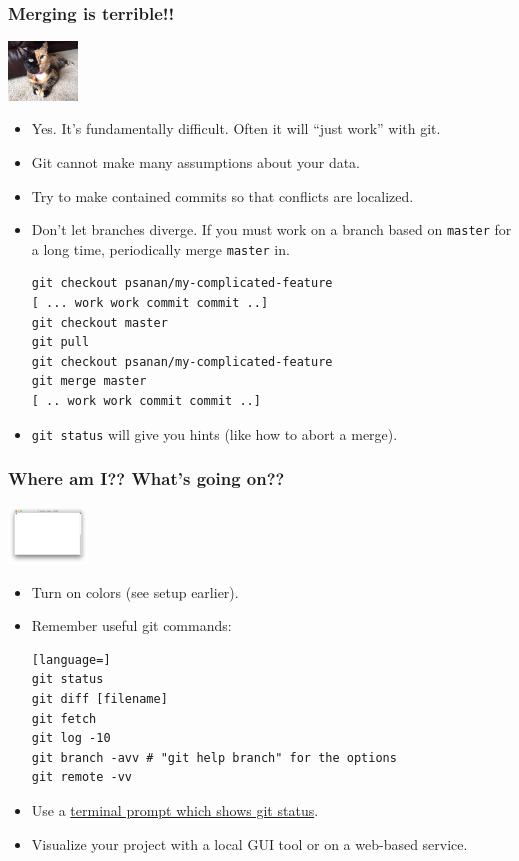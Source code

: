 \begin{frame}[fragile]
\frametitle{Merging is terrible!!}
\begin{center}
\includegraphics[width=70px]{chimera.jpg}
\end{center}
\begin{itemize}
\item Yes. It's fundamentally difficult. Often it will ``just work'' with git.
\item Git cannot make many assumptions about your data.
\item Try to make contained commits so that conflicts are localized.
\item Don't let branches diverge. If you must work on a branch based on \texttt{master} for a long time, periodically merge \texttt{master} in.
\begin{lstlisting}[basicstyle=\tiny\ttfamily]
git checkout psanan/my-complicated-feature
[ ... work work commit commit ..]
git checkout master
git pull
git checkout psanan/my-complicated-feature
git merge master
[ .. work work commit commit ..]
\end{lstlisting}
\item \lstinline{git status} will give you hints (like how to abort a merge).
\end{itemize}
\end{frame}

\begin{frame}[fragile]
\frametitle{Where am I?? What's going on??}
\begin{center}
\includegraphics[width=80px]{term}
\end{center}
\begin{itemize}
\item Turn on colors (see setup earlier).
\item Remember useful git commands:
\begin{lstlisting}[language=]
git status
git diff [filename]
git fetch
git log -10
git branch -avv # "git help branch" for the options
git remote -vv
\end{lstlisting}
\item Use a \href{https://raw.githubusercontent.com/git/git/master/contrib/completion/git-prompt.sh}{terminal prompt which shows git status}.
\item Visualize your project with a local GUI tool or on a web-based service.
\end{itemize}
\end{frame}

